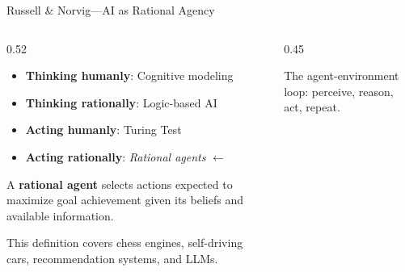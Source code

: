 \documentclass[aspectratio=169,11pt]{beamer}
\begin{document}
\begin{frame}{Russell \& Norvig---AI as Rational Agency \parencite{russell_norvig_ai}}
\begin{columns}[T]
\begin{column}{0.52\textwidth}
\begin{conceptbox}
\scriptsize
\begin{itemize}
    \item \textbf{Thinking humanly}: Cognitive modeling
    \item \textbf{Thinking rationally}: Logic-based AI
    \item \textbf{Acting humanly}: Turing Test
    \item \textbf{Acting rationally}: \emph{Rational agents} $\leftarrow$
\end{itemize}
\end{conceptbox}

\vspace{0.2em}
A \textbf{rational agent} selects actions expected to maximize goal achievement given its beliefs and available information.

\vspace{0.2em}
This definition covers chess engines, self-driving cars, recommendation systems, and LLMs.
\end{column}
\begin{column}{0.45\textwidth}
\begin{center}
\end{center}

{\scriptsize The agent-environment loop: perceive, reason, act, repeat.}
\end{column}
\end{columns}
\end{frame}
\end{document}
